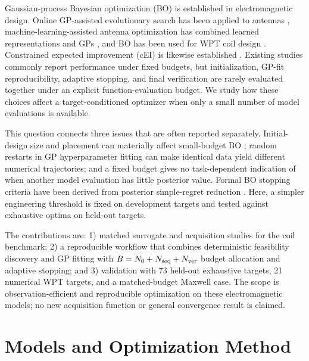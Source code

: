 \documentclass[10pt,conference,letterpaper]{IEEEtran}
\begin{document}
Gaussian-process Bayesian optimization (BO) is established in electromagnetic design. Online GP-assisted evolutionary search has been applied to antennas \cite{liu2014}, machine-learning-assisted antenna optimization has combined learned representations and GPs \cite{wu2024}, and BO has been used for WPT coil design \cite{sim2023}. Constrained expected improvement (cEI) is likewise established \cite{gardner}. Existing studies commonly report performance under fixed budgets, but initialization, GP-fit reproducibility, adaptive stopping, and final verification are rarely evaluated together under an explicit function-evaluation budget. We study how these choices affect a target-conditioned optimizer when only a small number of model evaluations is available.

This question connects three issues that are often reported separately. Initial-design size and placement can materially affect small-budget BO \cite{furuuchi2024}; random restarts in GP hyperparameter fitting can make identical data yield different numerical trajectories; and a fixed budget gives no task-dependent indication of when another model evaluation has little posterior value. Formal BO stopping criteria have been derived from posterior simple-regret reduction \cite{ishibashi2023}. Here, a simpler engineering threshold is fixed on development targets and tested against exhaustive optima on held-out targets.

The contributions are: 1) matched surrogate and acquisition studies for the coil benchmark; 2) a reproducible workflow that combines deterministic feasibility discovery and GP fitting with $B=N_0+N_{\rm seq}+N_{\rm ver}$ budget allocation and adaptive stopping; and 3) validation with 73 held-out exhaustive targets, 21 numerical WPT targets, and a matched-budget Maxwell case. The scope is observation-efficient and reproducible optimization on these electromagnetic models; no new acquisition function or general convergence result is claimed.

\section{Models and Optimization Method}
\end{document}
